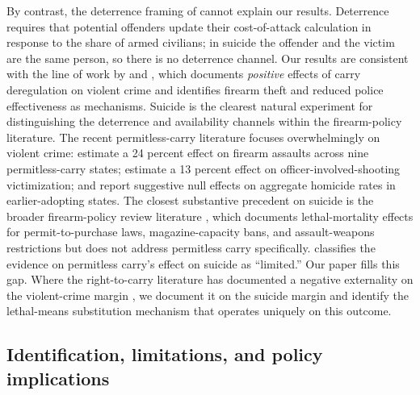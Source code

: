 \documentclass[12pt]{article}
\begin{document}
By contrast, the deterrence framing of \citet{lott1997} cannot
explain our results. Deterrence requires that potential offenders
update their cost-of-attack calculation in response to the share
of armed civilians; in suicide the offender and the victim are the
same person, so there is no deterrence channel. Our results are
consistent with the line of work by \citet{donohue2019} and
\citet{donohue2023}, which documents \emph{positive} effects of
carry deregulation on violent crime and identifies firearm theft
and reduced police effectiveness as mechanisms. Suicide is the
clearest natural experiment for distinguishing the deterrence and
availability channels within the firearm-policy literature. The
recent permitless-carry literature focuses overwhelmingly on
violent crime: \citet{doucette2023} estimate a 24 percent effect
on firearm assaults across nine permitless-carry states;
\citet{doucette2022} estimate a 13 percent effect on
officer-involved-shooting victimization; and \citet{hamill2019}
report suggestive null effects on aggregate homicide rates in
earlier-adopting states. The closest substantive precedent on
suicide is the broader firearm-policy review literature
\citep{leefirearm2017, santaella2016, klarevas2019}, which
documents lethal-mortality effects for permit-to-purchase laws,
magazine-capacity bans, and assault-weapons restrictions but does
not address permitless carry specifically. \citet{rand2024}
classifies the evidence on permitless carry's effect on suicide as
``limited.'' Our paper fills this gap. Where the right-to-carry
literature has documented a negative externality on the
violent-crime margin \citep{donohue2019, donohue2023, doucette2023,
doucette2022}, we document it on the suicide margin and identify
the lethal-means substitution mechanism that operates uniquely on
this outcome.

\subsection{Identification, limitations, and policy implications}\label{sec:caveats}
\end{document}
